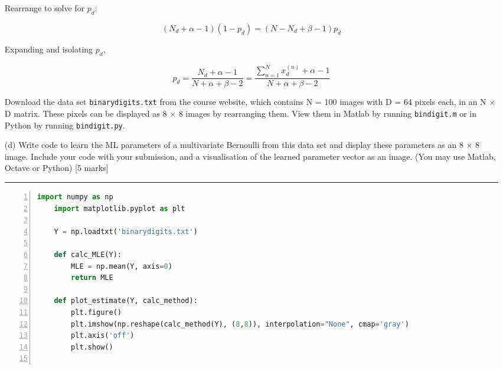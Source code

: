 \documentclass{article}
\begin{document}
\begin{enumerate}
    \vspace{10pt}
    
    Rearrange to solve for \(p_d\):
    
    \begin{equation}
    (N_d + \alpha - 1)(1 - p_d) = (N - N_d + \beta - 1) p_d
    \end{equation}
    
    Expanding and isolating \(p_d\),
    
    \begin{equation}
    \boxed{p_d = \frac{N_d + \alpha - 1}{N + \alpha + \beta - 2} = \frac{\sum_{n=1}^N x_d^{(n)} + \alpha - 1}{N + \alpha + \beta - 2}}
    \end{equation}

    \vspace{10pt}
    
    Download the data set \texttt{binarydigits.txt} from the course website, which contains N = 100 images with D = 64 pixels each, in an N × D matrix. These pixels can be displayed as 8 × 8 images by rearranging them. View them in Matlab by running \texttt{bindigit.m} or in Python by running \texttt{bindigit.py}.

    \vspace{10pt}

    \item[(d)] Write code to learn the ML parameters of a multivariate Bernoulli from this data set and display these parameters as an 8 × 8 image. Include your code with your submission, and a visualisation of the learned parameter vector as an image. (You may use Matlab, Octave or Python) [5 marks]

    \noindent\textcolor{gray}{\rule{0.1\linewidth}{0.4pt}}    

     \vspace{10pt}

    \begin{lstlisting}[language=Python, numbers=left, frame=single, breaklines=true]
    import numpy as np
    import matplotlib.pyplot as plt
    
    Y = np.loadtxt('binarydigits.txt')
    
    def calc_MLE(Y):
        MLE = np.mean(Y, axis=0)
        return MLE
    
    def plot_estimate(Y, calc_method):
        plt.figure()
        plt.imshow(np.reshape(calc_method(Y), (8,8)), interpolation="None", cmap='gray')
        plt.axis('off')
        plt.show()
    

\end{lstlisting}
\end{enumerate}
\end{document}
